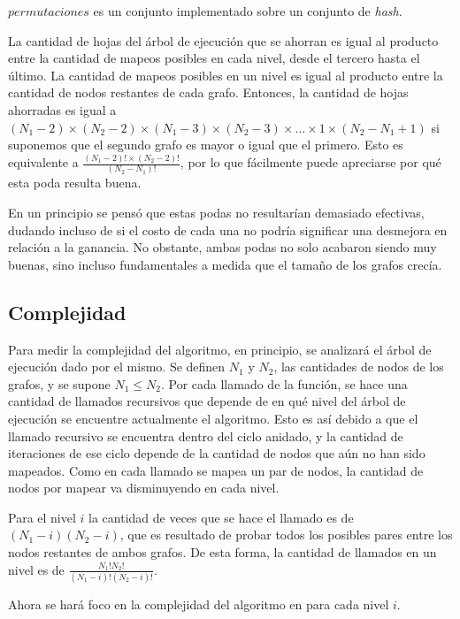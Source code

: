 $permutaciones$ es un conjunto implementado sobre un conjunto de \emph{hash}.

La cantidad de hojas del árbol de ejecución que se ahorran es igual al
producto entre la cantidad de mapeos posibles en cada nivel, desde el tercero
hasta el último. La cantidad de mapeos posibles en un nivel es igual al
producto entre la cantidad de nodos restantes de cada grafo. Entonces, la
cantidad de hojas ahorradas es igual a $(N_1 - 2) \times (N_2 - 2) \times
(N_1 - 3) \times (N_2 - 3) \times \dots \times 1 \times (N_2 - N_1 + 1)$ si
suponemos que el segundo grafo es mayor o igual que el primero. Esto es
equivalente a $\frac{(N_1 - 2)! \times (N_2 - 2)!}{(N_2 - N_1)!}$, por lo que
fácilmente puede apreciarse por qué esta poda resulta buena.

En un principio se pensó que estas podas no resultarían demasiado efectivas,
dudando incluso de si el costo de cada una no podría significar una
desmejora en relación a la ganancia. No obstante, ambas podas no solo
acabaron siendo muy buenas, sino incluso fundamentales a medida que el tamaño de los
grafos crecía.

\subsection{Complejidad}

Para medir la complejidad del algoritmo, en principio, se analizará el
árbol de ejecución dado por el mismo. Se definen $N_1$ y $N_2$, las cantidades
de nodos de los grafos, y se supone $N_1 \leq N_2$. Por cada llamado de
la función, se hace una cantidad de llamados recursivos que depende de en qué
nivel del árbol de ejecución se encuentre actualmente el algoritmo. Esto es
así debido a que el llamado recursivo se encuentra dentro del ciclo anidado,
y la cantidad de iteraciones de ese ciclo depende de la cantidad de nodos que
aún no han sido mapeados. Como en cada llamado se mapea un par de nodos, la
cantidad de nodos por mapear va disminuyendo en cada nivel.

Para el nivel $i$ la cantidad de veces que se hace el llamado es de
$(N_1 - i)  (N_2 - i)$, que es resultado de probar todos los posibles
pares entre los nodos restantes de ambos grafos. De esta forma, la cantidad de
llamados en un nivel es de
$\frac{N_1!  N_2!}{(N_1 - i)!  (N_2 - i)!}$.

Ahora se hará foco en la complejidad del algoritmo en para cada nivel $i$.

